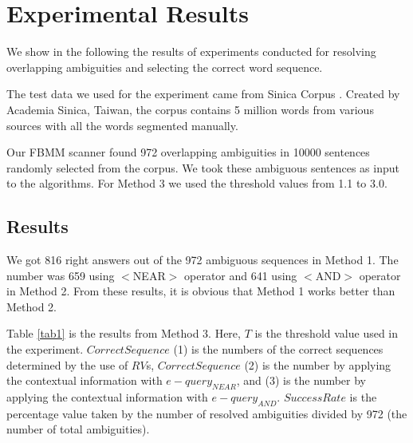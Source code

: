 \section{Experimental Results}
\label{experiment}

We show in the following the results of experiments conducted for resolving overlapping ambiguities and selecting the correct word sequence.

The test data we used for the experiment came from Sinica Corpus \cite{Sinica95}. Created by Academia Sinica, Taiwan, the corpus contains 5 million words from various sources with all the words segmented manually.

Our FBMM scanner found 972 overlapping ambiguities in 10000 sentences randomly selected from the corpus. We took these ambiguous sentences as input to the algorithms. For Method 3 we used the threshold values from 1.1 to 3.0. 

\subsection{Results}
\label{results}

We got 816 right answers out of the 972 ambiguous sequences in Method 1. The number was 659 using $<$NEAR$>$ operator and 641 using $<$AND$>$ operator in Method 2. From these results, it is obvious that Method 1 works better than Method 2.
   
Table \ref{tab1} is the results from Method 3. Here, $T$ is the threshold value used in the experiment. $CorrectSequence$ (1) is the numbers of the correct sequences determined by the use of $RV$s, $CorrectSequence$ (2) is the number by applying the contextual information with ${e-query}_{NEAR}$, and (3) is the number by applying the contextual information with ${e-query}_{AND}$. $SuccessRate$ is the percentage value taken by the number of resolved ambiguities divided by 972 (the number of total ambiguities). 

